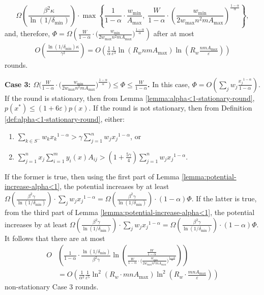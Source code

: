 \documentclass[11pt]{article}
\makeatletter
\newcommand{\wratio}{R_w}
\newenvironment{proofof}[1]{\par
  \pushQED{\qed}\normalfont \topsep3\p@\relax
  \trivlist
  \item[\hskip\labelsep
        \bfseries
    Proof of #1\@addpunct{.}]\ignorespaces
}{\popQED\endtrivlist\@endpefalse
}
\makeatother
\begin{document}
\begin{proofof}{Theorem \ref{thm:convergence-alpha<1}}
\begin{equation*}
\Omega\left(\frac{\beta^2\kappa}{\ln(1/\delta_{\min})}\right)\cdot \max\left\{\frac{1}{1-\alpha}\cdot \frac{ w_{\min}}{A_{\max}},\; \frac{W}{1-\alpha}\cdot\left(\frac{w_{\min}}{2w_{\max}n^2mA_{\max}}\right)^{\frac{1-\alpha}{\alpha}}\right\},
\end{equation*}
and, therefore, $\Phi = \Omega\left(\frac{W}{1-\alpha}\cdot\big(\frac{w_{\min}}{2w_{\max}n^2mA_{\max}}\big)^{\frac{1-\alpha}{\alpha}}\right)$ after at most
\begin{align*}
O\left(\frac{\ln(1/\delta_{\min})\kappa}{\gamma^2}\right) = O\left(\frac{1}{\alpha}\frac{1}{\varepsilon^3}\ln\left(\wratio nmA_{\max}\right)\ln\left(\wratio\frac{nmA_{\max}}{\varepsilon}\right) \right)
\end{align*}
rounds.

\noindent\textbf{Case 3: $\Omega\Big(\frac{W}{1-\alpha}\cdot\big(\frac{w_{\min}}{2w_{\max}n^2mA_{\max}}\big)^{\frac{1-\alpha}{\alpha}}\Big)\leq \Phi \leq \frac{W}{1-\alpha}$.} In this case, $\Phi = O\left(\sum_j w_j \frac{{x_j}^{1-\alpha}}{1-\alpha}\right)$. If the round is stationary, then from Lemma \ref{lemma:alpha<1-stationary-round}, $p(x^*)\leq (1+6\varepsilon)p(x)$. If the round is not stationary, then from Definition \ref{def:alpha<1-stationary-round}, either:
\begin{enumerate}
\item $\sum_{k\in S^-}w_k{x_k}^{1-\alpha} > \gamma \sum_{j=1}^n w_j {x_j}^{1-\alpha}$, or
\item $\sum_{j=1}^n x_j \sum_{i=1}^m y_i(x)A_{ij} > (1+\frac{5\gamma}{4}) \sum_{j=1}^n w_j {x_j}^{1-\alpha}$.
\end{enumerate}
If the former is true, then using the first part of Lemma \ref{lemma:potential-increase-alpha<1}, the potential increases by at least $\Omega\left(\frac{\beta^2\gamma}{\ln(1/\delta_{\min})}\right)\cdot \sum_j w_j {x_j}^{1-\alpha} = \Omega\left(\frac{\beta^2\gamma}{\ln(1/\delta_{\min})}\right)\cdot (1-\alpha)\Phi$. If the latter is true, from the third part of Lemma \ref{lemma:potential-increase-alpha<1}, the potential increases by at least $\Omega\left(\frac{\beta^2\gamma}{\ln(1/\delta_{\min})}\right)\cdot \sum_j w_j {x_j}^{1-\alpha} = \Omega\left(\frac{\beta^2\gamma}{\ln(1/\delta_{\min})}\right)\cdot (1-\alpha)\Phi$.
It follows that there are at most 
\begin{align*}
O&\left(\frac{1}{1-\alpha}\cdot\frac{\ln(1/\delta_{\min})}{\beta^2 \gamma}\ln\left(\frac{\frac{W}{1-\alpha}}{\frac{W}{1-\alpha}\cdot\big(\frac{w_{\min}}{2w_{\max}n^2mA_{\max}}\big)^{\frac{1-\alpha}{\alpha}}}\right)\right)\\ 
&= O\left(\frac{1}{\alpha^2}\frac{1}{\varepsilon^5}\ln^2\left(\wratio\cdot{mnA_{\max}}\right)\ln^2\left(\wratio\cdot\frac{mnA_{\max}}{\varepsilon}\right)\right)
\end{align*}
non-stationary Case 3 rounds.


\end{proofof}
\end{document}
